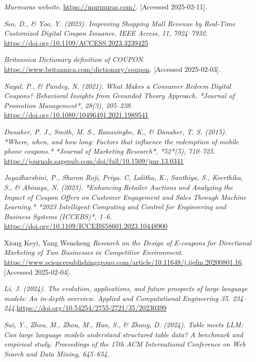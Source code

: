 \documentclass[licencjacka,en]{pracamgr}
\begin{document}
\begin{thebibliography}{99}

\raggedright

\textit{Murmuras website}.
\url{https://murmuras.com/}.
[Accessed 2025-02-11].

\textit{Seo, D., \& Yoo, Y. (2023). Improving Shopping Mall Revenue by Real-Time Customized Digital Coupon Issuance. IEEE Access, 11, 7924–7932.}
\url{https://doi.org/10.1109/ACCESS.2023.3239425}

\textit{Britannica Dictionary definition of COUPON}.
\url{https://www.britannica.com/dictionary/coupon}.
[Accessed 2025-02-03].

\textit{Nayal, P., \& Pandey, N. (2021). What Makes a Consumer Redeem Digital Coupons? Behavioral Insights from Grounded Theory Approach. *Journal of Promotion Management*, 28(3), 205–238.}
\url{https://doi.org/10.1080/10496491.2021.1989541}

\textit{Danaher, P. J., Smith, M. S., Ranasinghe, K., \& Danaher, T. S. (2015). *Where, when, and how long: Factors that influence the redemption of mobile phone coupons.* *Journal of Marketing Research*, *52*(5), 710--725.}
\url{https://journals.sagepub.com/doi/full/10.1509/jmr.13.0341}

\textit{Jayadharshini, P., Sharon Roji, Priya. C, Lalitha, K., Santhiya, S., Keerthika, S., \& Abinaya, N. (2023). *Enhancing Retailer Auctions and Analyzing the Impact of Coupon Offers on Customer Engagement and Sales Through Machine Learning.* *2023 Intelligent Computing and Control for Engineering and Business Systems (ICCEBS)*, 1–6. }
\url{https://doi.org/10.1109/ICCEBS58601.2023.10448900}

Xiong Keyi, Yang Wensheng
\textit{Research on the Design of E-coupons for Directional Marketing of Two Businesses in Competitive Environment}.
\url{https://www.sciencepublishinggroup.com/article/10.11648/j.ijefm.20200801.16}.
[Accessed 2025-02-04].

\textit{Li, J. (2024). The evolution, applications, and future prospects of large language models: An in-depth overview. Applied and Computational Engineering 35, 234–244.}\url{https://doi.org/10.54254/2755-2721/35/20230399}

\textit{Sui, Y., Zhou, M., Zhou, M., Han, S., \& Zhang, D. (2024). Table meets LLM: Can large language models understand structured table data? A benchmark and empirical study. Proceedings of the 17th ACM International Conference on Web Search and Data Mining, 645--654.}


\end{thebibliography}
\end{document}
